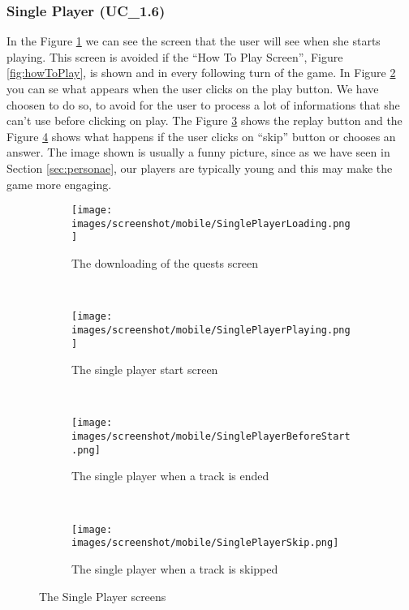 \subsubsection{Single Player (UC\_1.6)}

In the Figure \ref{fig:downloadingScreen} we can see the screen that the user will see when she starts playing. This screen is avoided if the ``How To Play Screen'', Figure \ref{fig:howToPlay}, is shown and in every following turn of the game. In Figure \ref{fig:singlePlayerMainScreen} you can se what appears when the user clicks on the play button. We have choosen to do so, to avoid for the user to process a lot of informations that she can't use before clicking on play. The Figure \ref{fig:singlePlayerEndTrack} shows the replay button and the Figure \ref{fig:singlePlayerSkippedTrack} shows what happens if the user clicks on ``skip'' button or chooses an answer. The image shown is usually a funny picture, since as we have seen in Section \ref{sec:personae}, our players are typically young and this may make the game more engaging.

\begin{figure}[H]
        \begin{subfigure}[b]{0.5\textwidth}
                \centering
\texttt{[image: images/screenshot/mobile/SinglePlayerLoading.png]}
\caption{The downloading of the quests screen}
\label{fig:downloadingScreen}
        \end{subfigure}%
        ~ %
        \begin{subfigure}[b]{0.5\textwidth}
                \centering
\texttt{[image: images/screenshot/mobile/SinglePlayerPlaying.png]}
\caption{The single player start screen}
\label{fig:singlePlayerMainScreen}
        \end{subfigure}
        ~ %
        \begin{subfigure}[b]{0.5\textwidth}
                \centering
\texttt{[image: images/screenshot/mobile/SinglePlayerBeforeStart.png]}
\caption{The single player when a track is ended}
\label{fig:singlePlayerEndTrack}
        \end{subfigure} 
        ~ %
        \begin{subfigure}[b]{0.5\textwidth}
                \centering
\texttt{[image: images/screenshot/mobile/SinglePlayerSkip.png]}
\caption{The single player when a track is skipped}
\label{fig:singlePlayerSkippedTrack}
        \end{subfigure}
        \caption{The Single Player screens}
        \label{fig:singlePlayer}
\end{figure}

